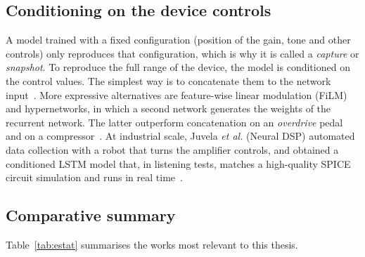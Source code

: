 \documentclass[ENG]{TFUOC}%
\begin{document}
\subsection{Conditioning on the device controls}

A model trained with a fixed configuration (position of the gain, tone and other controls) only reproduces that configuration, which is why it is called a \emph{capture} or \emph{snapshot}. To reproduce the full range of the device, the model is conditioned on the control values. The simplest way is to concatenate them to the network input~\cite{schmitz2018,wright2020}. More expressive alternatives are feature-wise linear modulation (FiLM)~\cite{comunita2023} and hypernetworks, in which a second network generates the weights of the recurrent network. The latter outperform concatenation on an \emph{overdrive} pedal and on a compressor~\cite{yeh2024hyper}. At industrial scale, Juvela \emph{et al.} (Neural DSP) automated data collection with a robot that turns the amplifier controls, and obtained a conditioned LSTM model that, in listening tests, matches a high-quality SPICE circuit simulation and runs in real time~\cite{juvela2023}.

\subsection{Comparative summary}

Table~\ref{tab:estat} summarises the works most relevant to this thesis.
\end{document}
